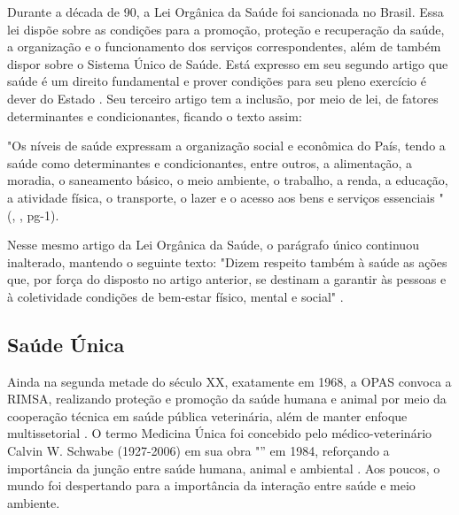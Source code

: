 \indent Durante a década de 90, a Lei Orgânica da Saúde foi sancionada no Brasil. Essa lei dispõe sobre as condições  para a promoção, proteção  e  recuperação  da  saúde,  a  organização  e  o  funcionamento  dos  serviços correspondentes, além de também dispor sobre o Sistema Único de Saúde. Está expresso em seu segundo artigo que saúde é um direito fundamental e prover condições para seu pleno exercício é dever do Estado \cite{BRASIL1990LeiSUS}. Seu terceiro artigo tem a inclusão, por meio de lei, de fatores determinantes e condicionantes, ficando o texto assim:

\begin{citacao}
"Os níveis de saúde expressam a organização social e econômica do País, tendo a saúde como determinantes e condicionantes, entre outros, a alimentação, a moradia, o saneamento básico, o meio ambiente, o trabalho, a renda, a educação, a atividade física, o transporte, o lazer e o acesso aos bens e serviços essenciais "
(\citeauthor{BRASIL2013LeiDeterminantesCondicionantesSaude}, \citeyear{BRASIL2013LeiDeterminantesCondicionantesSaude}, pg-1).
\end{citacao}

\indent Nesse mesmo artigo da Lei Orgânica da Saúde, o parágrafo único continuou inalterado, mantendo o seguinte texto: "Dizem respeito também à saúde as ações que, por força do disposto no artigo anterior, se destinam a garantir às pessoas e à coletividade condições de bem-estar físico, mental e social" \cite{BRASIL1990LeiSUS}.







\subsection{Saúde Única}

\indent Ainda na segunda metade do século XX, exatamente em 1968, a \acrfull{OPAS} convoca a \acrfull{RIMSA}, realizando proteção e promoção da saúde humana e animal por meio da cooperação técnica em saúde pública veterinária, além de manter enfoque multissetorial \cite{S1_OPAS_OMS}. O termo Medicina Única foi concebido pelo médico-veterinário Calvin W. Schwabe (1927-2006) em sua obra "” em 1984, reforçando a importância da junção entre saúde humana, animal e ambiental \cite{CFMVSaude}. Aos poucos, o mundo foi despertando para a importância da interação entre saúde e meio ambiente.

